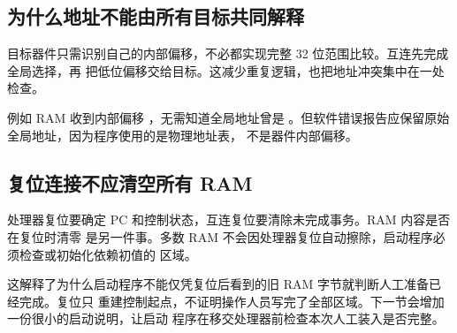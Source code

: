 \subsection{为什么地址不能由所有目标共同解释}

目标器件只需识别自己的内部偏移，不必都实现完整 32 位范围比较。互连先完成全局选择，再
把低位偏移交给目标。这减少重复逻辑，也把地址冲突集中在一处检查。

例如 RAM 收到内部偏移 ，无需知道全局地址曾是
。但软件错误报告应保留原始全局地址，因为程序使用的是物理地址表，
不是器件内部偏移。

\subsection{复位连接不应清空所有 RAM}

处理器复位要确定 PC 和控制状态，互连复位要清除未完成事务。RAM 内容是否在复位时清零
是另一件事。多数 RAM 不会因处理器复位自动擦除，启动程序必须检查或初始化依赖初值的
区域。

这解释了为什么启动程序不能仅凭复位后看到的旧 RAM 字节就判断人工准备已经完成。复位只
重建控制起点，不证明操作人员写完了全部区域。下一节会增加一份很小的启动说明，让启动
程序在移交处理器前检查本次人工装入是否完整。
